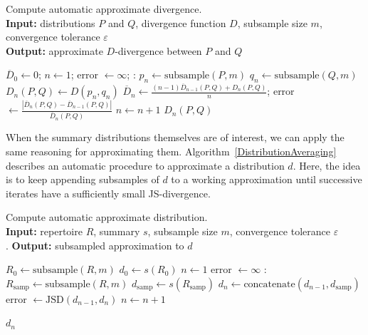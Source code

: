 \documentclass{article}
\begin{document}
\begin{algorithm}
    \caption{Compute automatic approximate divergence.\\
    \textbf{Input:} distributions $P$ and $Q$, divergence function $D$, subsample size $m$, convergence tolerance $\varepsilon$\\
    \textbf{Output:} approximate $D$-divergence between $P$ and $Q$
    }
    \label{DivergenceAveraging}
    \begin{algorithmic}
    \State $\overline{D}_0 \gets 0$;
    \State $n \gets 1$;
    \State error $\gets \infty$;
    :
    \State $p_n \gets \text{subsample}(P, m)$
    \State $q_n \gets \text{subsample}(Q, m)$
    \State $D_n(P, Q) \gets D(p_n, q_n)$
    \State $\overline{D}_n \gets \frac{(n - 1) \overline{D}_{n-1}(P, Q) + D_n(P, Q)}{n}$;
    \State error $\gets \frac{ \left| \overline D_n(P, Q) - \overline D_{n-1}(P, Q) \right|}
        { \overline D_n(P, Q) }$
    \State $n \gets n + 1$
    \EndWhile
    \Return $D_n(P, Q)$
\end{algorithmic}
\end{algorithm}


When the summary distributions themselves are of interest, we can apply the same reasoning for approximating them.
Algorithm~\ref{DistributionAveraging} describes an automatic procedure to approximate a distribution $d$.
Here, the idea is to keep appending subsamples of $d$ to a working approximation until successive iterates have a sufficiently small JS-divergence.
\begin{algorithm}
    \caption{Compute automatic approximate distribution.\\
        \textbf{Input:} repertoire $R$, summary $s$, subsample size $m$, convergence tolerance $\varepsilon$\\.
        \textbf{Output:} subsampled approximation to $d$}
    \label{DistributionAveraging}
    \begin{algorithmic}
        \State $R_0 \gets \text{subsample}(R, m)$
        \State $d_0 \gets s(R_0)$
        \State $n \gets 1$
        \State error $\gets \infty$
        :
        \State $R_\text{samp} \gets \text{subsample}(R, m)$
        \State $d_\text{samp} \gets s(R_\text{samp})$
        \State $d_n \gets \text{concatenate}(d_{n-1}, d_\text{samp})$
        \State error $\gets \text{JSD}(d_{n-1}, d_n)$
        \State $n \gets n + 1$
        \EndWhile
    \end{algorithmic}
    \Return $d_n$
\end{algorithm}
\end{document}
